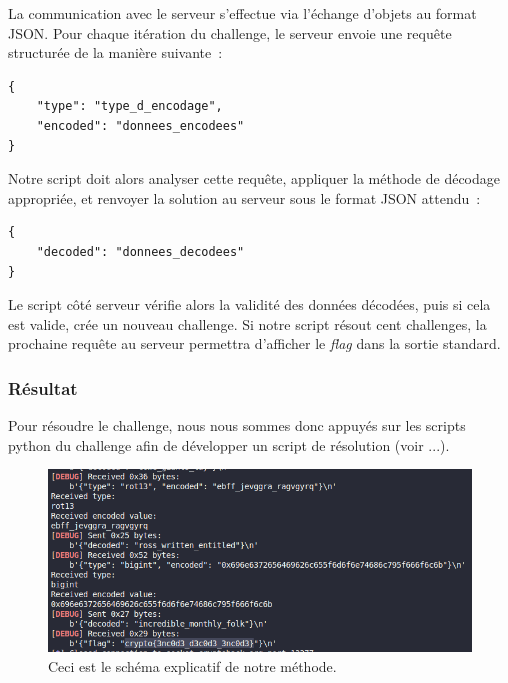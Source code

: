 La communication avec le serveur s'effectue via l'échange d'objets au
format JSON. Pour chaque itération du challenge, le serveur envoie une
requête structurée de la manière suivante~:

\begin{verbatim}
{
    "type": "type_d_encodage",
    "encoded": "donnees_encodees"
}
\end{verbatim}

Notre script doit alors analyser cette requête, appliquer la méthode de
décodage appropriée, et renvoyer la solution au serveur sous le format
JSON attendu~:

\begin{verbatim}
{
    "decoded": "donnees_decodees"
}
\end{verbatim}

Le script côté serveur vérifie alors la validité des données décodées,
puis si cela est valide, crée un nouveau challenge. Si notre script
résout cent challenges, la prochaine requête au serveur permettra
d'afficher le \textit{flag} dans la sortie standard.

\subsubsection{Résultat}
Pour résoudre le challenge, nous nous sommes donc appuyés sur les scripts
python du challenge afin de développer un script de résolution (voir
...).

\begin{figure}[H]
    \centering
    \includegraphics[width=0.8\linewidth]{Images/Encode/encode_chall_result.png}

    \caption{Ceci est le schéma explicatif de notre méthode.}

    \label{fig:encodeChallRes}
\end{figure}

